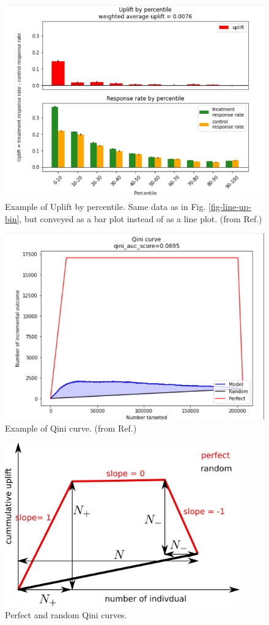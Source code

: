 \begin{figure}[h!]
\centering
\includegraphics[width=5in]
{uplift/bar-uplift-binned.png}
\caption{Example of Uplift by percentile. 
Same data as in Fig. \ref{fig-line-up-bin},
but conveyed as a bar plot
instead of as a line plot.
(from Ref.\cite{scikit-uplift})}
\label{fig-bar-up-bin}
\end{figure}

\begin{figure}[h!]
\centering
\includegraphics[width=5in]
{uplift/qini.png}
\caption{Example of Qini curve.
(from Ref.\cite{scikit-uplift})}
\label{fig-qini}
\end{figure}

\begin{figure}[h!]
\centering
\includegraphics[width=4in]
{uplift/perfect-and-random.png}
\caption{Perfect and random Qini curves.}
\label{fig-perfect-and-random}
\end{figure}



